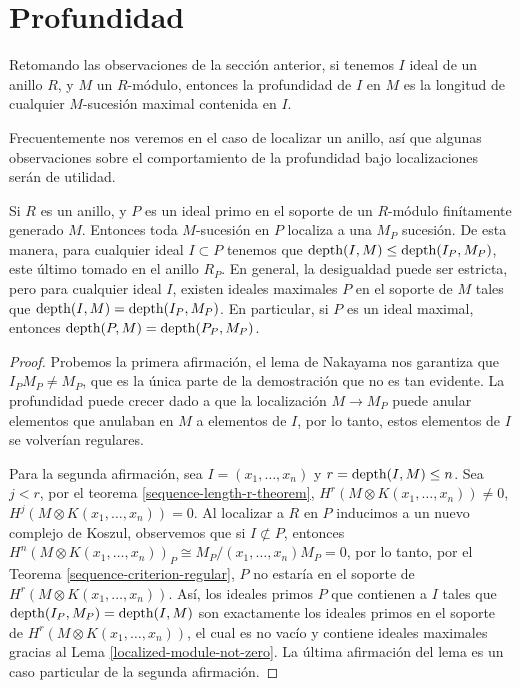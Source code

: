 \section{Profundidad}

Retomando las observaciones de la sección anterior, si tenemos $I$ ideal de un anillo $R$, y $M$ un $R$-módulo, entonces la profundidad de $I$ en $M$ es la longitud de cualquier $M$-sucesión maximal contenida en $I$.

Frecuentemente nos veremos en el caso de localizar un anillo, así que algunas observaciones sobre el comportamiento de la profundidad bajo localizaciones serán de utilidad.

\begin{lemma}
Si $R$ es un anillo, y $P$ es un ideal primo en el soporte de un $R$-módulo finítamente generado $M$. Entonces toda $M$-sucesión en $P$ localiza a una $M_P$ sucesión. De esta manera, para cualquier ideal $I \subset P$ tenemos que $\textrm{depth}(I,M) \leq \textrm{depth}(I_P, M_P)$, este último tomado en el anillo $R_P$. En general, la desigualdad puede ser estricta, pero para cualquier ideal $I$, existen ideales maximales $P$ en el soporte de $M$ tales que $\textrm{depth}(I,M) = \textrm{depth}(I_P, M_P)$. En particular, si $P$ es un ideal maximal, entonces $\textrm{depth}(P,M) = \textrm{depth}(P_P, M_P)$.
\end{lemma}

\begin{proof}
Probemos la primera afirmación, el lema de Nakayama nos garantiza que $I_PM_P \neq M_P$, que es la única parte de la demostración que no es tan evidente. La profundidad puede crecer dado a que la localización $M \rightarrow M_P$ puede anular elementos que anulaban en $M$ a elementos de $I$, por lo tanto, estos elementos de $I$ se volverían regulares.

Para la segunda afirmación, sea $I = (x_1,\dots,x_n)$ y $r = \textrm{depth}(I, M) \leq n$. Sea $j < r$, por el teorema \ref{sequence-length-r-theorem}, $H^r(M \otimes K(x_1,\dots,x_n)) \neq 0$, $H^j(M \otimes K(x_1,\dots,x_n)) = 0$. Al localizar a $R$ en $P$ inducimos a un nuevo complejo de Koszul, observemos que si $I \not\subset P$, entonces $H^n(M\otimes K(x_1,\dots,x_n))_P \cong M_P/(x_1,\dots,x_n)M_P = 0$, por lo tanto, por el Teorema \ref{sequence-criterion-regular},  $P$ no estaría en el soporte de $H^r(M \otimes K(x_1,\dots,x_n))$. Así, los ideales primos $P$ que contienen a $I$ tales que $\textrm{depth}(I_P, M_P) = \textrm{depth}(I, M)$ son exactamente los ideales primos en el soporte de $H^r(M \otimes K(x_1,\dots,x_n))$, el cual es no vacío y contiene ideales maximales gracias al Lema \ref{localized-module-not-zero}. La última afirmación del lema es un caso particular de la segunda afirmación.
\end{proof}


